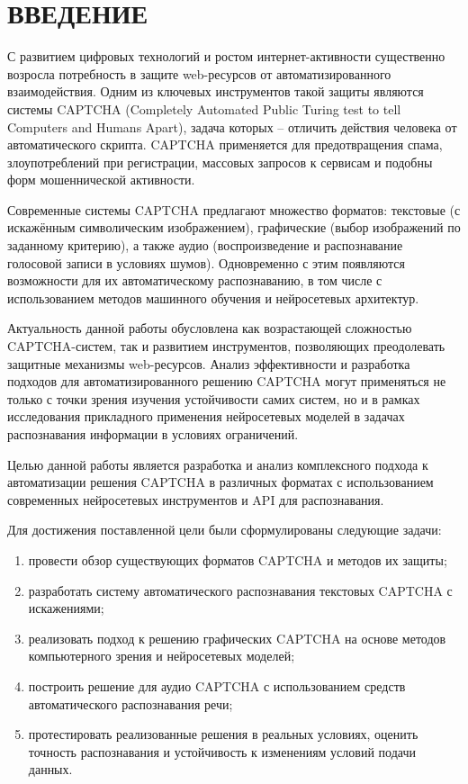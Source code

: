 \chapter*{ВВЕДЕНИЕ}

С развитием цифровых технологий и ростом интернет-активности существенно возросла 
потребность в защите web-ресурсов от автоматизированного взаимодействия. Одним 
из ключевых инструментов такой защиты являются системы CAPTCHA (Completely 
Automated Public Turing test to tell Computers and Humans Apart), задача которых 
-- отличить действия человека от автоматического скрипта. CAPTCHA применяется для 
предотвращения спама, злоупотреблений при регистрации, массовых запросов к 
сервисам и подобны форм мошеннической активности.

Современные системы CAPTCHA предлагают множество форматов: текстовые (с 
искажённым символическим изображением), графические (выбор изображений по 
заданному критерию), а также аудио (воспроизведение и распознавание голосовой 
записи в условиях шумов). Одновременно с этим появляются возможности для их 
автоматическому распознаванию, в том числе с использованием методов 
машинного обучения и нейросетевых архитектур.

Актуальность данной работы обусловлена как возрастающей сложностью 
CAPTCHA-систем, так и развитием инструментов, позволяющих преодолевать защитные 
механизмы web-ресурсов. Анализ эффективности и разработка подходов для 
автоматизированного решению CAPTCHA могут применяться не только с точки зрения 
изучения устойчивости самих систем, но и в рамках исследования прикладного 
применения нейросетевых моделей в задачах распознавания информации в условиях 
ограничений.

Целью данной работы является разработка и анализ комплексного подхода к 
автоматизации решения CAPTCHA в различных форматах с использованием современных 
нейросетевых инструментов и API для распознавания.

Для достижения поставленной цели были сформулированы следующие задачи:

\begin{enumerate}
    \item провести обзор существующих форматов CAPTCHA и методов их защиты;
    \item разработать систему автоматического распознавания текстовых CAPTCHA с 
    искажениями;
    \item реализовать подход к решению графических CAPTCHA на основе методов 
    компьютерного зрения и нейросетевых моделей;
    \item построить решение для аудио CAPTCHA с использованием средств 
    автоматического распознавания речи;
    \item протестировать реализованные решения в реальных условиях, оценить 
    точность распознавания и устойчивость к изменениям условий подачи данных.
\end{enumerate}
